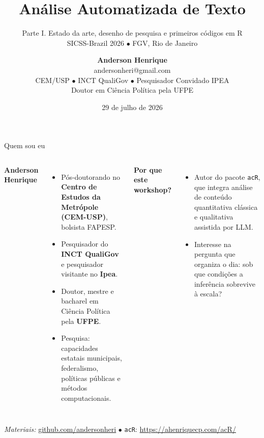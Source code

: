 \documentclass[11pt,aspectratio=169]{beamer}
\title[Análise Automatizada de Texto | Manhã]{Análise Automatizada de Texto}
\subtitle{Parte I. Estado da arte, desenho de pesquisa e primeiros códigos em R \\
\small SICSS-Brazil 2026 $\bullet$ FGV, Rio de Janeiro}
\author[Anderson Henrique]{\textbf{Anderson Henrique} \\ \small andersonheri@gmail.com \\
\small CEM/USP $\bullet$ INCT QualiGov $\bullet$ Pesquisador Convidado IPEA \\
\small Doutor em Ciência Política pela UFPE}
\institute[SICSS-Brazil]{Summer Institute in Computational Social Science, Brazil}
\date{29 de julho de 2026}
\begin{document}
\begin{frame}
  \titlepage
\end{frame}

\begin{frame}{Quem sou eu}
\begin{columns}[T]
\textbf{Anderson Henrique}
\vspace{0.15cm}
\begin{itemize}\small
  \item Pós-doutorando no \textbf{Centro de Estudos da Metrópole (CEM-USP)},
        bolsista FAPESP.
  \item Pesquisador do \textbf{INCT QualiGov} e pesquisador visitante no
        \textbf{Ipea}.
  \item Doutor, mestre e bacharel em Ciência Política pela \textbf{UFPE}.
  \item Pesquisa: capacidades estatais municipais, federalismo, políticas
        públicas e métodos computacionais.
\end{itemize}
\textbf{Por que este workshop?}
\vspace{0.15cm}
\begin{itemize}\small
  \item Autor do pacote \texttt{acR}, que integra análise de conteúdo
        quantitativa clássica e qualitativa assistida por LLM.
  \item Interesse na pergunta que organiza o dia: sob que condições a
        inferência sobrevive à escala?
\end{itemize}
\end{columns}
\vspace{0.25cm}
\footnotesize \textit{Materiais:} \url{github.com/andersonheri} $\bullet$
\texttt{acR}: \url{https://ahenriquecp.com/acR/}
\end{frame}
\end{document}
